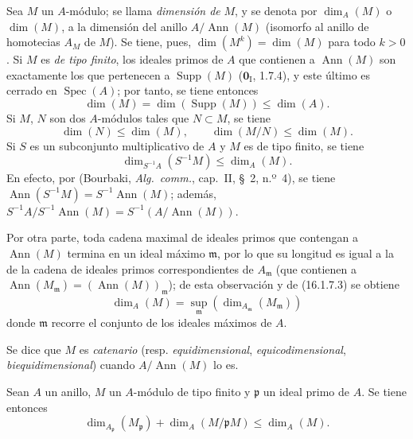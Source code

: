 \begin{env}[16.1.7]
\label{0.16.1.7-es}
Sea $M$ un $A$-módulo; se llama \emph{dimensión de} $M$, y se denota por
$\dim_A(M)$ o $\dim(M)$, a la dimensión del anillo $A/\operatorname{Ann}(M)$
(isomorfo al anillo de homotecias $A_M$ de $M$). Se tiene, pues,
$\dim(M^k)=\dim(M)$ para todo $k>0$. Si $M$ es \emph{de tipo finito}, los ideales
primos de $A$ que contienen a $\operatorname{Ann}(M)$ son exactamente los que
pertenecen a $\operatorname{Supp}(M)$ ($\mathbf{0}_{\mathrm I}$, 1.7.4), y este último
es cerrado en $\operatorname{Spec}(A)$; por tanto, se tiene entonces
\[
\label{0.16.1.7.1-es}
  \dim(M)=\dim(\operatorname{Supp}(M))\leq\dim(A).
\tag{16.1.7.1}
\]
Si $M$, $N$ son dos $A$-módulos tales que $N\subset M$, se tiene
\[
\label{0.16.1.7.2-es}
  \dim(N)\leq\dim(M),\qquad \dim(M/N)\leq\dim(M).
\tag{16.1.7.2}
\]
Si $S$ es un subconjunto multiplicativo de $A$ y $M$ es de tipo finito, se
tiene
\[
\label{0.16.1.7.3-es}
  \dim_{S^{-1}A}(S^{-1}M)\leq\dim_A(M).
\tag{16.1.7.3}
\]
En efecto, por (Bourbaki, \emph{Alg.~comm.}, cap.~II, \S~2, n.º~4), se tiene
$\operatorname{Ann}(S^{-1}M)=S^{-1}\operatorname{Ann}(M)$; además,
$S^{-1}A/S^{-1}\operatorname{Ann}(M)=S^{-1}(A/\operatorname{Ann}(M))$.

Por otra parte, toda cadena maximal de ideales primos que contengan a
$\operatorname{Ann}(M)$ termina en un ideal máximo $\mathfrak{m}$, por lo que
su longitud es igual a la de la cadena de ideales primos correspondientes de
$A_{\mathfrak{m}}$ (que contienen a
$\operatorname{Ann}(M_{\mathfrak{m}})=(\operatorname{Ann}(M))_{\mathfrak{m}}$);
de esta observación y de (16.1.7.3) se obtiene
\[
\label{0.16.1.7.4-es}
  \dim_A(M)=\sup_{\mathfrak{m}}
  (\dim_{A_{\mathfrak{m}}}(M_{\mathfrak{m}}))
\tag{16.1.7.4}
\]
donde $\mathfrak{m}$ recorre el conjunto de los ideales máximos de $A$.

Se dice que $M$ es \emph{catenario} (resp. \emph{equidimensional}, \emph{equicodimensional},
\emph{biequidimensional}) cuando $A/\operatorname{Ann}(M)$ lo es.
\end{env}

\begin{proposition}[16.1.8]
\label{0.16.1.8-es}
Sean $A$ un anillo, $M$ un $A$-módulo de tipo finito y $\mathfrak{p}$ un ideal
primo de $A$. Se tiene entonces
\[
\label{0.16.1.8.1-es}
  \dim_{A_{\mathfrak{p}}}(M_{\mathfrak{p}})
  +\dim_A(M/\mathfrak{p}M)\leq\dim_A(M).
\tag{16.1.8.1}
\]
\end{proposition}

